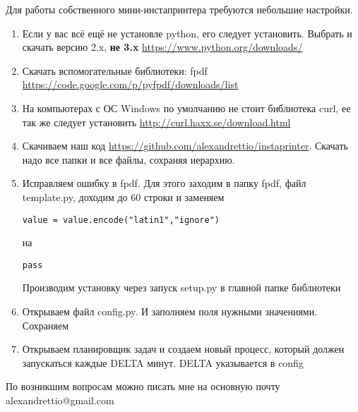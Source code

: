 \documentclass[12pt]{article}
\begin{document}
Для работы собственного мини-инстапринтера требуются небольшие настройки. 
\begin{enumerate}
\item Если у вас всё ещё не установле python, его следует установить. Выбрать и скачать версию 2.x, {\bf не 3.x} 	\url{https://www.python.org/downloads/}
\item Скачать вспомогательные библиотеки: fpdf \url{https://code.google.com/p/pyfpdf/downloads/list}
\item На компьютерах с ОС Windows по умолчанию не стоит библиотека curl, ее так же следует установить \url{http://curl.haxx.se/download.html}
\item Скачиваем наш код \url{https://github.com/alexandrettio/instaprinter}. Скачать надо все папки и все файлы, сохраняя иерархию.
\item Исправляем ошибку в fpdf. Для этого заходим в папку fpdf, файл template.py, доходим до 60 строки и заменяем  
\begin{lstlisting}
value = value.encode("latin1","ignore") 
\end{lstlisting}
на
\begin{lstlisting}
pass
\end{lstlisting}
Производим установку через запуск setup.py в главной папке библиотеки
\item Открываем файл config.py. И заполняем поля нужными значениями. Сохраняем 
\item Открываем планировщик задач и создаем новый процесс, который должен запускаться каждые DELTA минут. DELTA указывается в config
\end{enumerate}
По возникшим вопросам можно писать мне на основную почту alexandrettio@gmail.com
\end{document}
